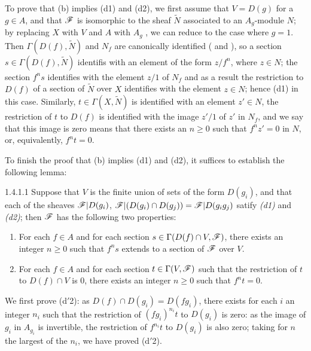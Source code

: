 To prove that (b) implies (d1) and (d2), we first assume that $V=D(g)$ for a $g\in A$, and
that $\mathscr{F}$ is isomorphic to the sheaf $\widetilde{N}$ associated to an $A_g$-module $N$;
by replacing $X$ with $V$ and $A$ with $A_g$ , we can reduce to the case
where $g=1$. Then $\Gamma(D(f),\widetilde{N})$ and $N_f$ are canonically identified
( and ), so a section $s\in\Gamma(D(f),\widetilde{N})$
identifis with an element of the form $z/f^n$, where $z\in N$; the section $f^n s$ identifies
with the element $z/1$ of $N_f$ and as a result the restriction to $D(f)$ of a section of
$\widetilde{N}$ over $X$ identifies with the element $z\in N$; hence (d1) in this case.
Similarly, $t\in\Gamma(X,\widetilde{N})$ is identified with an element $z'\in N$, the
restriction of $t$ to $D(f)$ is identified with the image $z'/1$ of $z'$ in $N_f$, and we say
that this image is zero means that there exists an $n\geqslant 0$ such that $f^n z'=0$ in
$N$, or, equivalently, $f^n t=0$.

To finish the proof that (b) implies (d1) and (d2), it suffices to establish the following
lemma:
\begin{envs}[Lemma]{1.4.1.1}
\label{lem-1.1.4.1.1}
Suppose that $V$ is the finite union of sets of the form $D(g_i)$, and that each of the
sheaves $\mathscr{F}|D(g_i)$, $\mathscr{F}|(D(g_i)\cap D(g_j))=\mathscr{F}|D(g_i g_j)$ satify \emph{(d1)}
and \emph{(d2)}; then $\mathscr{F}$ has the following two properties:
\begin{enumerate}[label=\rm{(d$'$\arabic*)}]
  \item For each $f\in A$ and for each section $s\in\Gamma(D(f)\cap V,\mathscr{F})$, there exists
        an integer $n\geqslant 0$ such that $f^n s$ extends to a section of $\mathscr{F}$ over
        $V$.
  \item For each $f\in A$ and for each section $t\in\Gamma(V,\mathscr{F})$ such that the
        restriction of $t$ to $D(f)\cap V$ is $0$, there exists an integer $n\geqslant 0$
        such that $f^n t=0$.
\end{enumerate}
\end{envs}

We first prove (d$'$2): as $D(f)\cap D(g_i)=D(fg_i)$, there exists for each $i$ an integer
$n_i$ such that the restriction of $(fg_i)^{n_i}t$ to $D(g_i)$ is zero: as the image of $g_i$
in $A_{g_i}$ is invertible, the restriction of $f^{n_i}t$ to $D(g_i)$ is also zero; taking
for $n$ the largest of the $n_i$, we have proved (d$'$2).

